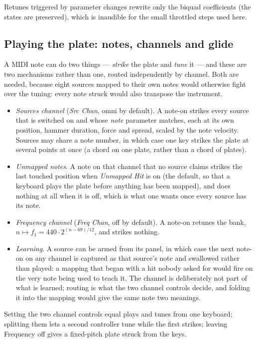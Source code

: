 \documentclass[11pt,a4paper]{article}
\begin{document}
Retunes triggered by parameter changes
rewrite only the biquad coefficients (the states are preserved), which is
inaudible for the small throttled steps used here.

\subsection{Playing the plate: notes, channels and glide}
\label{sec:notes}

A MIDI note can do two things --- \emph{strike} the plate and \emph{tune}
it --- and these are two mechanisms rather than one, routed independently
by channel. Both are needed, because eight sources mapped to their own
notes would otherwise fight over the tuning: every note struck would also
transpose the instrument.

\begin{itemize}
\item \emph{Sources channel} (\emph{Src Chan}, omni by default). A note-on
  strikes every source that is switched on and whose \emph{note} parameter
  matches, each at its own position, hammer duration, force and spread,
  scaled by the note velocity. Sources may share a note number, in which
  case one key strikes the plate at several points at once (a chord on one
  plate, rather than a chord of plates).
\item \emph{Unmapped notes}. A note on that channel that no source claims
  strikes the last touched position when \emph{Unmapped Hit} is on (the
  default, so that a keyboard plays the plate before anything has been
  mapped), and does nothing at all when it is off, which is what one wants
  once every source has its note.
\item \emph{Frequency channel} (\emph{Freq Chan}, off by default). A
  note-on retunes the bank, $n \mapsto f_1 = 440 \cdot 2^{(n-69)/12}$,
  and strikes nothing.
\item \emph{Learning}. A source can be armed from its panel, in which case
  the next note-on on any channel is captured as that source's note and
  swallowed rather than played: a mapping that began with a hit nobody
  asked for would fire on the very note being used to teach it. The channel
  is deliberately not part of what is learned; routing is what the two
  channel controls decide, and folding it into the mapping would give the
  same note two meanings.
\end{itemize}
%
Setting the two channel controls equal plays and tunes from one keyboard;
splitting them lets a second controller tune while the first strikes;
leaving Frequency off gives a fixed-pitch plate struck from the keys.
\end{document}
